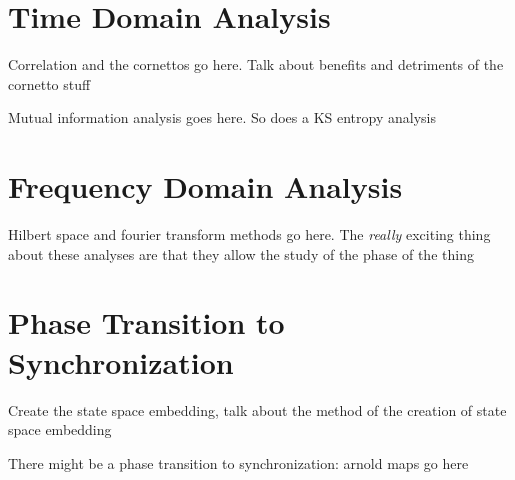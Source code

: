 \documentclass[12pt]{article}
\begin{document}


\section{Time Domain Analysis}

Correlation and the cornettos go here. Talk about benefits and detriments of the cornetto stuff


Mutual information analysis goes here. So does a KS entropy analysis

\section{Frequency Domain Analysis}
Hilbert space and fourier transform methods go here. The \emph{really} exciting thing about these analyses are that they allow the study of the phase of the thing


\section{Phase Transition to Synchronization}

Create the state space embedding, talk about the method of the creation of state space embedding

There might be a phase transition to synchronization: arnold maps go here

%
%
%
%
%
%
%
\end{document}
